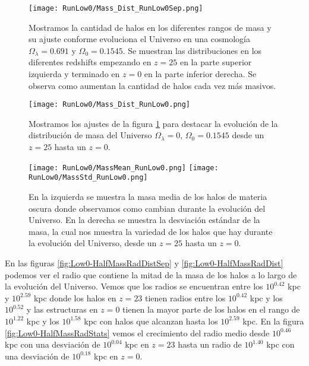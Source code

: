 \begin{figure}[H]
    \centering
    \texttt{[image: RunLow0/Mass\_Dist\_RunLow0Sep.png]}
    \caption[Distribución de masa]{\footnotesize Mostramos la cantidad de halos en los diferentes rangos de masa y su ajuste conforme evoluciona el Universo en una cosmología $\Omega_\lambda = 0.691$ y $\Omega_0 = 0.1545$. Se muestran las distribuciones en los diferentes redshifts empezando en $z=25$ en la parte superior izquierda y terminado en $z=0$ en la parte inferior derecha. Se observa como aumentan la cantidad de halos cada vez más masivos.}
    \label{fig:Low0-MassDistSep}
\end{figure}

\begin{figure}[H]
    \centering
    \texttt{[image: RunLow0/Mass\_Dist\_RunLow0.png]}
    \caption[Comparación de distribución de masa]{\footnotesize Mostramos los ajustes de la figura \ref{fig:Low0-MassDistSep} para destacar la evolución de la distribución de masa del Universo $\Omega_\lambda = 0$, $\Omega_0 = 0.1545$ desde un $z=25$ hasta un $z=0$.}
    \label{fig:Low0-MassDist}
\end{figure}

\begin{figure}[H]
    \centering
    \texttt{[image: RunLow0/MassMean\_RunLow0.png]}
    \texttt{[image: RunLow0/MassStd\_RunLow0.png]}
    \caption[Media y desviación estándar de la distribución de masa]{\footnotesize En la izquierda se muestra la masa media de los halos de materia oscura donde observamos como cambian durante la evolución del Universo. En la derecha se muestra la desviación estándar de la masa, la cual nos muestra la variedad de los halos que hay durante la evolución del Universo, desde un $z=25$ hasta un $z=0$.}
    \label{fig:Low0-MassStats}
\end{figure}

En las figuras \ref{fig:Low0-HalfMassRadDistSep} y \ref{fig:Low0-HalfMassRadDist} podemos ver el radio que contiene la mitad de la masa de los halos a lo largo de la evolución del Universo. Vemos que los radios se encuentran entre los $10^{0.42}$ kpc y $10^{2.59}$ kpc donde los halos en $z=23$ tienen radios entre los $10^{0.42}$ kpc y los $10^{0.52}$ y las estructuras en $z=0$ tienen la mayor parte de los halos en el rango de $10^{1.22}$ kpc y los $10^{1.58}$ kpc con halos que alcanzan hasta los $10^{2.59}$ kpc. En la figura \ref{fig:Low0-HalfMassRadStats} vemos el crecimiento del radio medio desde $10^{0.46}$ kpc con una desviación de $10^{0.04}$ kpc en $z=23$ hasta un radio de $10^{1.40}$ kpc con una desviación de $10^{0.18}$ kpc en $z=0$.

